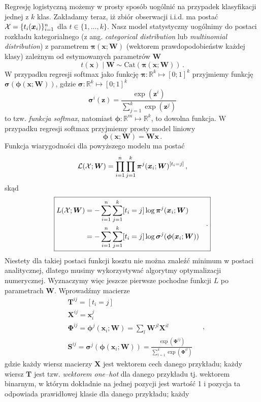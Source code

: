 \documentclass{myclass}
\numberwithin{equation}{subsection}
\begin{document}
Regresję logistyczną możemy w prosty sposób uogólnić na przypadek klasyfikacji jednej z \(k\) klas.
Zakładamy teraz, iż zbiór obserwacji i.i.d. ma postać \(\mathcal{X} = \{t_i(\bm{x}_i)\}_{i=1}^n\) dla \(t
\in \{1,\ldots,k\}\). Nasz model statystyczny uogólnimy do postaci rozkładu kategorialnego (z ang.
\textit{categorical distribution} lub \textit{multinomial distribution}) z parametrem
\(\bm{\pi}(\bm{x}; \bm{W})\) (wektorem prawdopodobieństw każdej klasy) zależnym od estymowanych
parametrów \(\bm{W}\)
\[
t(\bm{x}) \mid \bm{W} \sim \mathrm{Cat}(\bm{\pi}(\bm{x}; \bm{W}))\,.
\]
W przypadku regresji softmax jako funkcję \(\bm{\pi}: \mathbb{R}^k \mapsto [0;1]^k\) przyjmiemy
funkcję \(\bm{\sigma}(\bm{\phi}(\bm{x}; \bm{W}))\), gdzie \(\bm{\sigma}: \mathbb{R}^k \mapsto
[0;1]^k\)
\[
\bm{\sigma}^i(\bm{z}) = \frac{\exp(\bm{z}^i)}{ \sum_{j=1}^k \exp(\bm{z}^j)}
\]
to tzw. \emph{funkcja softmax}, natomiast \(\bm{\phi}: \mathbb{R}^m \mapsto \mathbb{R}^k\), to
dowolna funkcja. W przypadku regresji softmax przyjmiemy prosty model liniowy
\[
\bm{\phi}(\bm{x}; \bm{W}) = \bm{W}\bm{x}\,.
\]
Funkcja wiarygodności dla powyższego modelu ma postać
\[
\mathcal{L}(\mathcal{X}; \bm{W}) = \prod_{i=1}^n \prod_{j=1}^k \bm{\pi}^j(\bm{x}_i; \bm{W})^{[t_i = j]}\,,
\]
skąd
\[
\boxed{
\begin{split}
L(\mathcal{X}; \bm{W}) &= - \sum_{i=1}^n \sum_{j=1}^k [t_i = j] \log \bm{\pi}^j(\bm{x}_i; \bm{W})\\
                    &= - \sum_{i=1}^n \sum_{j=1}^k [t_i = j] \log \bm{\sigma}^j(\bm{\phi}(\bm{x}_i; \bm{W}))
\end{split}\quad.
}
\]
Niestety dla takiej postaci funkcji kosztu nie można znaleźć minimum w postaci analitycznej, dlatego
musimy wykorzystywać algorytmy optymalizacji numerycznej. Wyznaczymy więc jeszcze pierwsze pochodne
funkcji \(L\) po parametrach \(\bm{W}\). Wprowadźmy macierze
\[
\begin{split}
&\bm{T}^{ij} = [t_i = j]\\
&\bm{X}^{ij} = \bm{x}_i^j \\
&\bm{\Phi}^{ij} = \bm{\phi}^j(\bm{x}_i; \bm{W}) = \sum_l \bm{W}^{jl} \bm{X}^{il}\\
&\bm{S}^{ij} = \bm{\sigma}^j(\bm{\phi}(\bm{x}_i; \bm{W})) = \frac{\exp(\bm{\Phi}^{ij})}{\sum_{l=1}^k \exp(\bm{\Phi}^{il})}
\end{split}\quad,
\]
gdzie każdy wiersz macierzy \(\bm{X}\) jest wektorem cech danego przykładu; każdy wiersz \(\bm{T}\)
jest tzw. \emph{wektorem one--hot} dla danego przykładu tj. wektorem binarnym, w którym dokładnie na
jednej pozycji jest wartość 1 i pozycja ta odpowiada prawidłowej klasie dla danego przykładu; każdy
\end{document}
